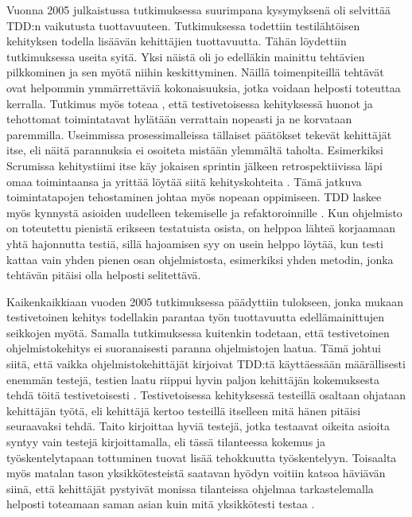 \documentclass[finnish,nonumbib,nocopyright]{gradu2}
\begin{document}
Vuonna 2005 julkaistussa tutkimuksessa \cite{tddeff} suurimpana kysymyksenä oli selvittää TDD:n vaikutusta tuottavuuteen. Tutkimuksessa todettiin testilähtöisen kehityksen todella lisäävän kehittäjien tuottavuutta. Tähän löydettiin tutkimuksessa \cite{tddeff} useita syitä. Yksi näistä oli jo edelläkin mainittu tehtävien pilkkominen ja sen myötä niihin keskittyminen. Näillä toimenpiteillä tehtävät ovat helpommin ymmärrettäviä kokonaisuuksia, jotka voidaan helposti toteuttaa kerralla. Tutkimus myös toteaa \cite{tddeff}, että testivetoisessa kehityksessä huonot ja tehottomat toimintatavat hylätään verrattain nopeasti ja ne korvataan paremmilla. Useimmissa prosessimalleissa tällaiset päätökset tekevät kehittäjät itse, eli näitä parannuksia ei osoiteta mistään ylemmältä taholta. Esimerkiksi Scrumissa kehitystiimi itse käy jokaisen sprintin jälkeen retrospektiivissa läpi omaa toimintaansa ja yrittää löytää siitä kehityskohteita \cite{scrumguide}. Tämä jatkuva toimintatapojen tehostaminen johtaa myös nopeaan oppimiseen. TDD laskee myös kynnystä asioiden uudelleen tekemiselle ja refaktoroinnille \cite{tddeff}. Kun ohjelmisto on toteutettu pienistä erikseen testatuista osista, on helppoa lähteä korjaamaan yhtä hajonnutta testiä, sillä hajoamisen syy on usein helppo löytää, kun testi kattaa vain yhden pienen osan ohjelmistosta, esimerkiksi yhden metodin, jonka tehtävän pitäisi olla helposti selitettävä.

Kaikenkaikkiaan vuoden 2005 tutkimuksessa \cite{tddeff} päädyttiin tulokseen, jonka mukaan testivetoinen kehitys todellakin parantaa työn tuottavuutta edellämainittujen seikkojen myötä. Samalla tutkimuksessa kuitenkin todetaan, että testivetoinen ohjelmistokehitys ei suoranaisesti paranna ohjelmistojen laatua. Tämä johtui siitä, että vaikka ohjelmistokehittäjät kirjoivat TDD:tä käyttäessään määrällisesti enemmän testejä, testien laatu riippui hyvin paljon kehittäjän kokemuksesta tehdä töitä testivetoisesti \cite{tddeff}. Testivetoisessa kehityksessä testeillä osaltaan ohjataan kehittäjän työtä, eli kehittäjä kertoo testeillä itselleen mitä hänen pitäisi seuraavaksi tehdä. Taito kirjoittaa hyviä testejä, jotka testaavat oikeita asioita syntyy vain testejä kirjoittamalla, eli tässä tilanteessa kokemus ja työskentelytapaan tottuminen tuovat lisää tehokkuutta työskentelyyn. Toisaalta myös matalan tason yksikkötesteistä saatavan hyödyn voitiin katsoa häviävän siinä, että kehittäjät pystyivät monissa tilanteissa ohjelmaa tarkastelemalla helposti toteamaan saman asian kuin mitä yksikkötesti testaa \cite{tddeff}.
\end{document}
